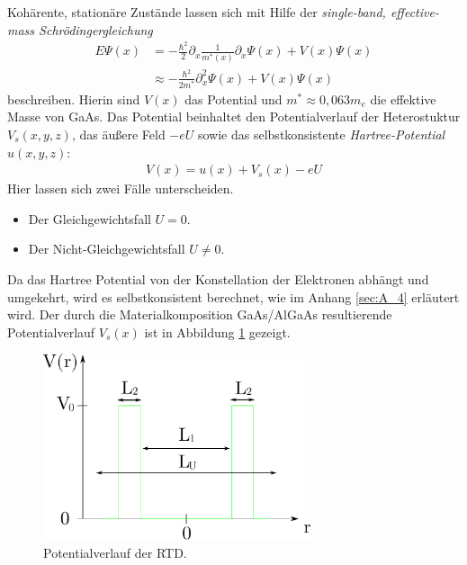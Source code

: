 Kohärente, stationäre Zustände lassen sich mit Hilfe der \emph{single-band, effective-mass Schrödingergleichung} \cite{frensley3}
\begin{equation}
  \begin{aligned}
    E\Psi(x) &= -\frac{\hbar^2}{2}\partial_x \frac{1}{m^*(x)}\partial_x\Psi(x) + V(x)\Psi(x)    \\
    &\approx -\frac{\hbar^2}{2m^*}\partial_x^2\Psi(x) + V(x)\Psi(x)
  \end{aligned}
  \label{eq:schroedinger}
\end{equation}
beschreiben. Hierin sind $V(x)$ das Potential und $m^*\approx 0,063m_e$ die effektive Masse von GaAs. Das Potential beinhaltet den Potentialverlauf der Heterostuktur $V_s(x,y,z)$, das äußere Feld $-eU$ sowie das selbstkonsistente \emph{Hartree-Potential} $u(x,y,z)$:
\begin{align}
  V({x}) = u({x}) + V_s({x}) - eU
\end{align}
Hier lassen sich zwei Fälle unterscheiden.
\begin{itemize}
  \item Der Gleichgewichtsfall $U=0$. %
  \item Der Nicht-Gleichgewichtsfall $U\neq 0$. %
\end{itemize}
Da das Hartree Potential von der Konstellation der Elektronen abhängt und umgekehrt, wird es selbstkonsistent berechnet, wie im Anhang \ref{sec:A_4} erläutert wird.
Der durch die Materialkomposition GaAs/AlGaAs resultierende Potentialverlauf $V_s(x)$ ist in Abbildung \ref{fig:pot1} gezeigt.
\begin{figure}
  \centering
  \includegraphics[width=0.7\textwidth]{plots/potential.pdf}
  \caption{Potentialverlauf der RTD.}
  \label{fig:pot1}
\end{figure}

